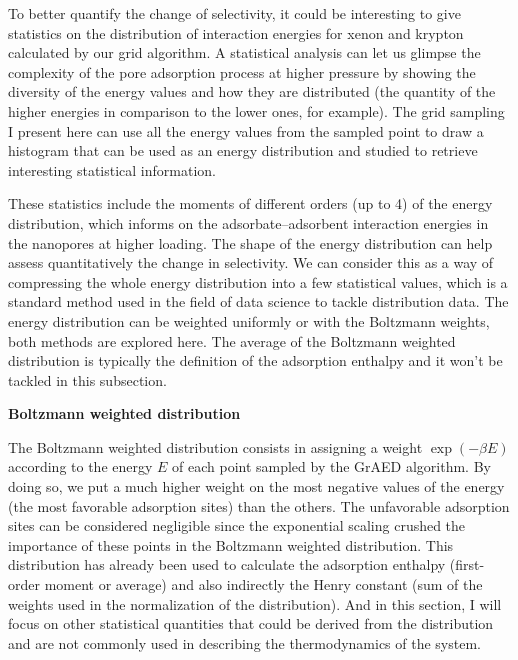 \documentclass[main]{subfiles}
\begin{document}
To better quantify the change of selectivity, it could be interesting to give statistics on the distribution of interaction energies for xenon and krypton calculated by our grid algorithm. A statistical analysis can let us glimpse the complexity of the pore adsorption process at higher pressure by showing the diversity of the energy values and how they are distributed (the quantity of the higher energies in comparison to the lower ones, for example). The grid sampling I present here can use all the energy values from the sampled point to draw a histogram that can be used as an energy distribution and studied to retrieve interesting statistical information.

These statistics include the moments of different orders (up to 4) of the energy distribution, which informs on the adsorbate--adsorbent interaction energies in the nanopores at higher loading. The shape of the energy distribution can help assess quantitatively the change in selectivity. We can consider this as a way of compressing the whole energy distribution into a few statistical values, which is a standard method used in the field of data science to tackle distribution data. The energy distribution can be weighted uniformly or with the Boltzmann weights, both methods are explored here. The average of the Boltzmann weighted distribution is typically the definition of the adsorption enthalpy and it won't be tackled in this subsection.

\textbf{Boltzmann weighted distribution}

The Boltzmann weighted distribution consists in assigning a weight $\exp(-\beta E)$ according to the energy $E$ of each point sampled by the GrAED algorithm. By doing so, we put a much higher weight on the most negative values of the energy (the most favorable adsorption sites) than the others. The unfavorable adsorption sites can be considered negligible since the exponential scaling crushed the importance of these points in the Boltzmann weighted distribution. This distribution has already been used to calculate the adsorption enthalpy (first-order moment or average) and also indirectly the Henry constant (sum of the weights used in the normalization of the distribution). And in this section, I will focus on other statistical quantities that could be derived from the distribution and are not commonly used in describing the thermodynamics of the system.
\end{document}
